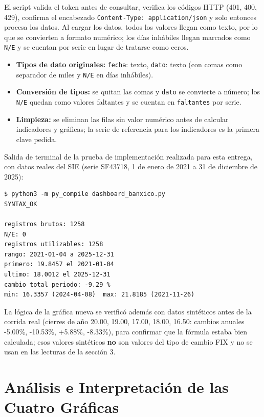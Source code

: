 \documentclass[11pt]{article}
\begin{document}
El script valida el token antes de consultar, verifica los códigos HTTP
(401, 400, 429), confirma el encabezado \texttt{Content-Type:
application/json} y solo entonces procesa los datos. Al cargar los datos,
todos los valores llegan como texto, por lo que se convierten a formato
numérico; los días inhábiles llegan marcados como \texttt{N/E} y se
cuentan por serie en lugar de tratarse como ceros.

\begin{itemize}
\item \textbf{Tipos de dato originales:} \texttt{fecha}: texto,
  \texttt{dato}: texto (con comas como separador de miles y
  \texttt{N/E} en días inhábiles).
\item \textbf{Conversión de tipos:} se quitan las comas y
  \texttt{dato} se convierte a número; los \texttt{N/E} quedan como
  valores faltantes y se cuentan en \texttt{faltantes} por serie.
\item \textbf{Limpieza:} se eliminan las filas sin valor numérico
  antes de calcular indicadores y gráficas; la serie de referencia
  para los indicadores es la primera clave pedida.
\end{itemize}

Salida de terminal de la prueba de implementación realizada para esta
entrega, con datos reales del SIE (serie SF43718, 1 de enero de 2021 a
31 de diciembre de 2025):

\begin{verbatim}
$ python3 -m py_compile dashboard_banxico.py
SYNTAX_OK

registros brutos: 1258
N/E: 0
registros utilizables: 1258
rango: 2021-01-04 a 2025-12-31
primero: 19.8457 el 2021-01-04
ultimo: 18.0012 el 2025-12-31
cambio total periodo: -9.29 %
min: 16.3357 (2024-04-08)  max: 21.8185 (2021-11-26)
\end{verbatim}

La lógica de la gráfica nueva se verificó además con datos sintéticos
antes de la corrida real (cierres de año 20.00, 19.00, 17.00, 18.00,
16.50: cambios anuales -5.00\%, -10.53\%, +5.88\%, -8.33\%), para
confirmar que la fórmula estaba bien calculada; esos valores sintéticos
\textbf{no} son valores del tipo de cambio FIX y no se usan en las
lecturas de la sección 3.

\section{Análisis e Interpretación de las Cuatro Gráficas}
\end{document}
